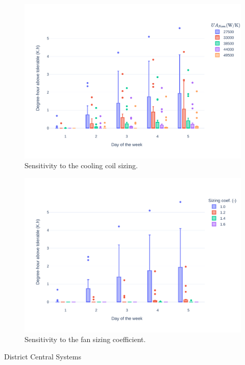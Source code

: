 \begin{figure}[!htbp]
\centering
\includegraphics[width=\linewidth]{figures/CoilSizing.pdf}
\caption{Sensitivity to the cooling coil sizing.}
\label{fig:coil}
\end{figure}

\begin{figure}[!htbp]
\centering
\includegraphics[width=\linewidth]{figures/FanSizing.pdf}
\caption{Sensitivity to the fan sizing coefficient.}
\label{fig:fan}
\end{figure}

District Central Systems


